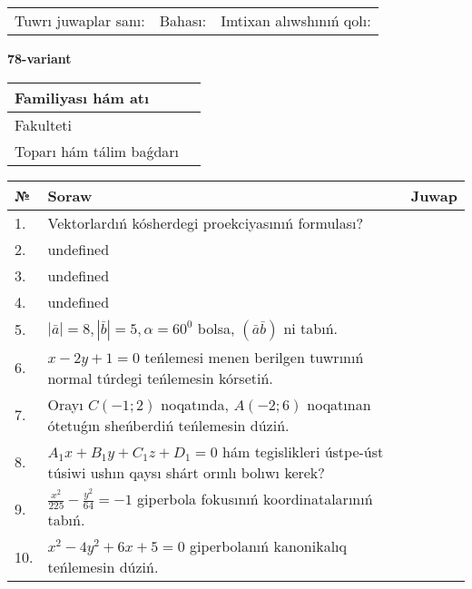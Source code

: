 \documentclass{article}
\begin{document}
\vspace{0.7cm}

\begin{tabular}{lll}
Tuwrı juwaplar sanı: \underline{\hspace{1cm}} & 
Bahası: \underline{\hspace{1cm}} & 
Imtixan alıwshınıń qolı: \underline{\hspace{2cm}} \\
\end{tabular}

\egroup

\newpage


\textbf{78-variant}\\

\bgroup
\def\arraystretch{1.6} %

\begin{tabular}{|m{5.7cm}|m{9.5cm}|}
\hline
Familiyası hám atı & \\
\hline
Fakulteti  & \\
\hline
Toparı hám tálim baǵdarı  & \\
\hline
\end{tabular}

\vspace{0.7cm}

\begin{tabular}{|m{0.7cm}|m{10cm}|m{4cm}|}
\hline
№ & Soraw & Juwap \\
\hline
1. & Vektorlardıń kósherdegi proekciyasınıń formulası? &  \\
\hline
2. & undefined &  \\
\hline
3. & undefined &  \\
\hline
4. & undefined &  \\
\hline
5. & \(\left| \bar{a} \right| = 8, \left| \bar{b} \right| = 5, \alpha = 60^{0}\) bolsa, \(( \bar{a}\bar{b} )\) ni tabıń. &  \\
\hline
6. & \(x - 2 y + 1 = 0\) teńlemesi menen berilgen tuwrınıń normal túrdegi teńlemesin kórsetiń. &  \\
\hline
7. & Orayı \(C (- 1;2)\) noqatında, \(A (- 2;6 )\) noqatınan ótetuǵın sheńberdiń teńlemesin dúziń. &  \\
\hline
8. & \(A_{1}x + B_{1}y + C_{1}z + D_{1} = 0\) hám tegislikleri ústpe-úst túsiwi ushın qaysı shárt orınlı bolıwı kerek? &  \\
\hline
9. & \(\frac{x^{2}}{225} - \frac{y^{2}}{64} = - 1\) giperbola fokusınıń koordinatalarınıń tabıń. &  \\
\hline
10. & \(x^{2} - 4 y^{2} + 6 x + 5 = 0\) giperbolanıń kanonikalıq teńlemesin dúziń. & \\
\hline
\end{tabular}
\end{document}
